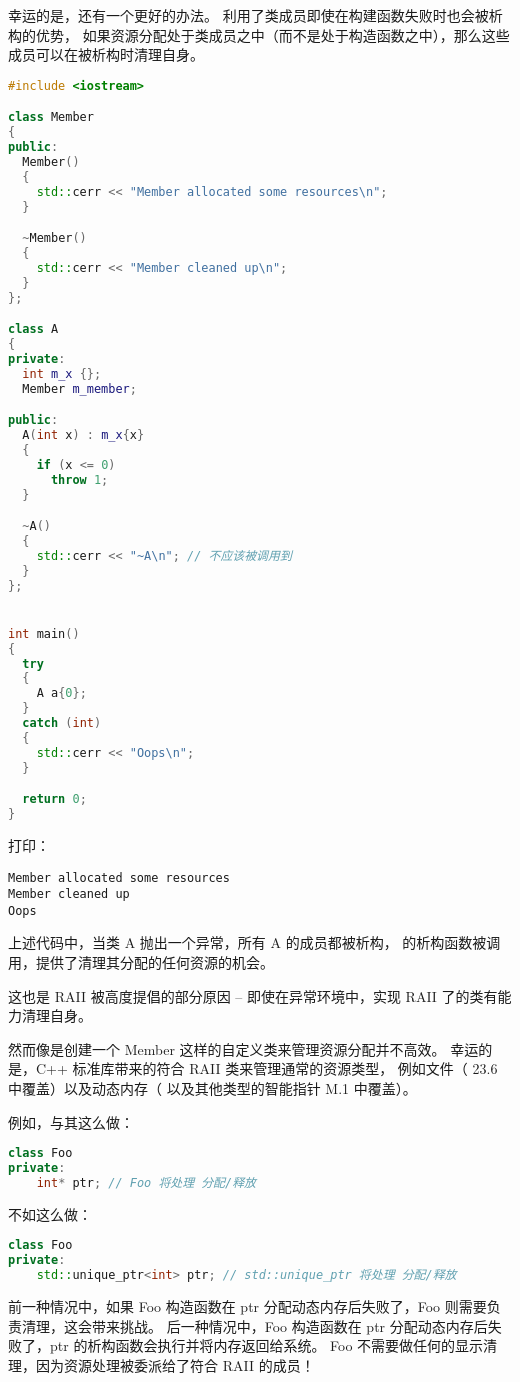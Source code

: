 \documentclass[../../LearnCpp.tex]{subfiles}
\begin{document}
幸运的是，还有一个更好的办法。
利用了类成员即使在构建函数失败时也会被析构的优势，
如果资源分配处于类成员之中（而不是处于构造函数之中），那么这些成员可以在被析构时清理自身。

\begin{lstlisting}[language=C++]
#include <iostream>

class Member
{
public:
  Member()
  {
    std::cerr << "Member allocated some resources\n";
  }

  ~Member()
  {
    std::cerr << "Member cleaned up\n";
  }
};

class A
{
private:
  int m_x {};
  Member m_member;

public:
  A(int x) : m_x{x}
  {
    if (x <= 0)
      throw 1;
  }

  ~A()
  {
    std::cerr << "~A\n"; // 不应该被调用到
  }
};


int main()
{
  try
  {
    A a{0};
  }
  catch (int)
  {
    std::cerr << "Oops\n";
  }

  return 0;
}
\end{lstlisting}

打印：

\begin{lstlisting}
Member allocated some resources
Member cleaned up
Oops
\end{lstlisting}

上述代码中，当类 A 抛出一个异常，所有 A 的成员都被析构，
 的析构函数被调用，提供了清理其分配的任何资源的机会。

这也是 RAII 被高度提倡的部分原因 -- 即使在异常环境中，实现 RAII 了的类有能力清理自身。

然而像是创建一个 Member 这样的自定义类来管理资源分配并不高效。
幸运的是，C++ 标准库带来的符合 RAII 类来管理通常的资源类型，
例如文件（ 23.6 中覆盖）以及动态内存（
以及其他类型的智能指针 M.1 中覆盖）。

例如，与其这么做：

\begin{lstlisting}[language=C++]
class Foo
private:
    int* ptr; // Foo 将处理 分配/释放
\end{lstlisting}

不如这么做：

\begin{lstlisting}[language=C++]
class Foo
private:
    std::unique_ptr<int> ptr; // std::unique_ptr 将处理 分配/释放
\end{lstlisting}

前一种情况中，如果 Foo 构造函数在 ptr 分配动态内存后失败了，Foo 则需要负责清理，这会带来挑战。
后一种情况中，Foo 构造函数在 ptr 分配动态内存后失败了，ptr 的析构函数会执行并将内存返回给系统。
Foo 不需要做任何的显示清理，因为资源处理被委派给了符合 RAII 的成员！
\end{document}
